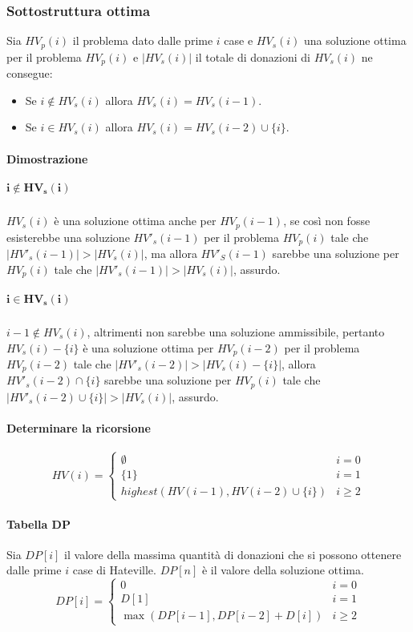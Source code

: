 \subsubsection{Sottostruttura ottima}
Sia $HV_p(i)$ il problema dato dalle prime $i$ case e $HV_s(i)$ una soluzione ottima per il problema $HV_p(i)$ e $|HV_s(i)|$ il totale di donazioni di $HV_s(i)$ ne consegue:
\begin{itemize}
\item Se $i\not\in HV_s(i)$ allora $HV_s(i) = HV_s(i-1)$.
\item Se $i\in HV_s(i)$ allora $HV_s(i) = HV_s(i-2)\cup\{i\}$.
\end{itemize}
\paragraph{Dimostrazione}
\subparagraph{$\mathbf{i\not\in HV_s(i)}$}
$HV_s(i)$ \`e una soluzione ottima anche per $HV_p(i-1)$, se cos\`i non fosse esisterebbe una soluzione $HV'_s(i-1)$ per il problema $HV_p(i)$ tale che $|HV'_s(i-1)|>|HV_s(i)|$, ma allora $HV'_S(i-1)$ sarebbe 
una soluzione per $HV_p(i)$ tale che $|HV'_s(i-1)|>|HV_s(i)|$, assurdo.
\subparagraph{$\mathbf{i\in HV_s(i)}$}
$i-1\not\in HV_s(i)$, altrimenti non sarebbe una soluzione ammissibile, pertanto $HV_s(i)-\{i\}$ \`e una soluzione ottima per $HV_p(i-2)$ per il problema $HV_p(i-2)$ tale che $|HV'_s(i-2)|>|HV_s(i)-\{i\}|$, allora
$HV'_s(i-2)\cap\{i\}$ sarebbe una soluzione per $HV_p(i)$ tale che $|HV'_s(i-2)\cup\{i\}|>|HV_s(i)|$, assurdo.
\paragraph{Determinare la ricorsione}
$$
HV(i)=
\begin{cases}
\emptyset\quad& i=0\\
\{1\} & i=1\\
highest(HV(i-1), HV(i-2)\cup\{i\}) & i\ge 2
\end{cases}
$$
\paragraph{Tabella DP}
Sia $DP[i]$ il valore della massima quantit\`a di donazioni che si possono ottenere dalle prime $i$ case di Hateville. $DP[n]$ \`e il valore della soluzione ottima.
$$
DP[i]=
\begin{cases}
0 \quad& i=0\\
D[1] & i=1\\
\max(DP[i-1], DP[i-2]+D[i]) & i\ge 2
\end{cases}
$$
